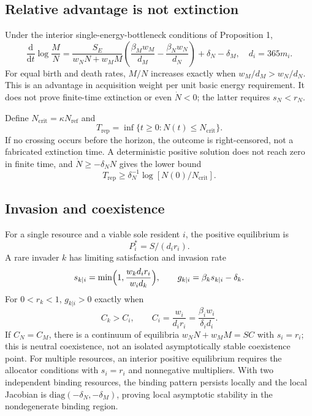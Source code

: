 \documentclass[11pt]{article}
\newcommand{\dd}{\mathrm{d}}
\begin{document}
\subsection{Relative advantage is not extinction}
Under the interior single-energy-bottleneck conditions of Proposition 1,
\begin{equation}
\frac{\dd}{\dd t}\log\frac{M}{N}
=\frac{S_E}{w_NN+w_MM}
\left(\frac{\beta_Mw_M}{d_M}-\frac{\beta_Nw_N}{d_N}\right)
+\delta_N-\delta_M,\quad d_i=365m_i.
\label{eq:prop2}
\end{equation}
For equal birth and death rates, $M/N$ increases exactly when $w_M/d_M>w_N/d_N$. This is an advantage in acquisition weight per unit basic energy requirement. It does not prove finite-time extinction or even $\dot N<0$; the latter requires $s_N<r_N$.

Define $N_{\mathrm{crit}}=\kappa N_{\mathrm{ref}}$ and
\begin{equation}
T_{\mathrm{rep}}=\inf\{t\ge0:N(t)\le N_{\mathrm{crit}}\}.
\label{eq:trep}
\end{equation}
If no crossing occurs before the horizon, the outcome is right-censored, not a fabricated extinction time. A deterministic positive solution does not reach zero in finite time, and $\dot N\ge-\delta_NN$ gives the lower bound
\begin{equation}
T_{\mathrm{rep}}\ge \delta_N^{-1}\log[N(0)/N_{\mathrm{crit}}].
\label{eq:trepbound}
\end{equation}

\subsection{Invasion and coexistence}
For a single resource and a viable sole resident $i$, the positive equilibrium is
\begin{equation}
P_i^*=S/(d_ir_i).
\label{eq:resident}
\end{equation}
A rare invader $k$ has limiting satisfaction and invasion rate
\begin{equation}
s_{k|i}=\min\Bigl(1,\frac{w_kd_ir_i}{w_id_k}\Bigr),\qquad
g_{k|i}=\beta_ks_{k|i}-\delta_k.
\label{eq:invasion}
\end{equation}
For $0<r_k<1$, $g_{k|i}>0$ exactly when
\begin{equation}
C_k>C_i,\qquad C_i=\frac{w_i}{d_ir_i}=\frac{\beta_iw_i}{\delta_id_i}.
\label{eq:C}
\end{equation}
If $C_N=C_M$, there is a continuum of equilibria $w_NN+w_MM=SC$ with $s_i=r_i$; this is neutral coexistence, not an isolated asymptotically stable coexistence point. For multiple resources, an interior positive equilibrium requires the allocator conditions with $s_i=r_i$ and nonnegative multipliers. With two independent binding resources, the binding pattern persists locally and the local Jacobian is $\mathrm{diag}(-\delta_N,-\delta_M)$, proving local asymptotic stability in the nondegenerate binding region.
\end{document}
